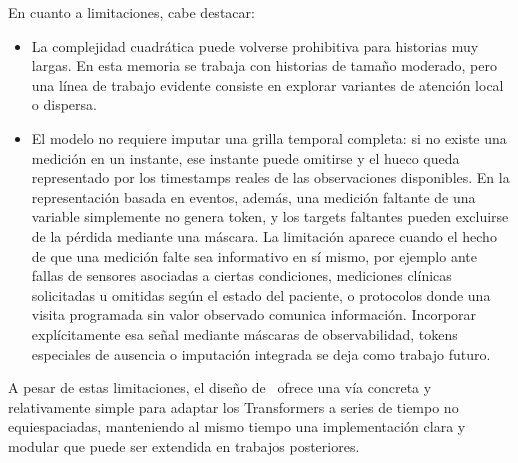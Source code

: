 \hfill

En cuanto a limitaciones, cabe destacar:
\begin{itemize}
    \item La complejidad cuadrática puede volverse prohibitiva para historias muy largas. En esta memoria se trabaja con historias de tamaño moderado, pero una línea de trabajo evidente consiste en explorar variantes de atención local o dispersa.
    \item El modelo no requiere imputar una grilla temporal completa: si no existe una medición en un instante, ese instante puede omitirse y el hueco queda representado por los timestamps reales de las observaciones disponibles. En la representación basada en eventos, además, una medición faltante de una variable simplemente no genera token, y los targets faltantes pueden excluirse de la pérdida mediante una máscara. La limitación aparece cuando el hecho de que una medición falte sea informativo en sí mismo, por ejemplo ante fallas de sensores asociadas a ciertas condiciones, mediciones clínicas solicitadas u omitidas según el estado del paciente, o protocolos donde una visita programada sin valor observado comunica información. Incorporar explícitamente esa señal mediante máscaras de observabilidad, tokens especiales de ausencia o imputación integrada se deja como trabajo futuro.
\end{itemize}

A pesar de estas limitaciones, el diseño de \CTTransformer\ ofrece una vía concreta y relativamente simple para adaptar los Transformers a series de tiempo no equiespaciadas, manteniendo al mismo tiempo una implementación clara y modular que puede ser extendida en trabajos posteriores.
